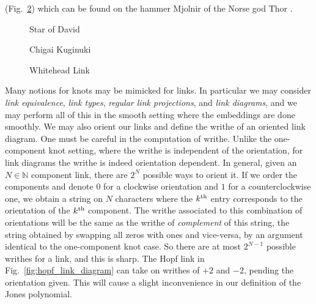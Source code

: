     (Fig.~\ref{fig:whitehead_link}) which can be found on the
    hammer Mjolnir of the Norse god Thor
    \cite[p.~309]{MonteliusMjolnirHopfLink}.
    \begin{figure}
        \centering
        \begin{minipage}[b]{0.49\textwidth}
            \centering
            \caption{Star of David}
            \label{fig:hopf_link_star_of_david}
        \end{minipage}
        \hfill
        \begin{minipage}[b]{0.49\textwidth}
            \centering
            \vspace{2em}
            \caption{Chigai Kuginuki}
            \label{fig:hopf_link_chigai_kuginuki}
        \end{minipage}
    \end{figure}
    \begin{figure}
        \centering
        \caption{Whitehead Link}
        \label{fig:whitehead_link}
    \end{figure}
    \par\hfill\par
    Many notions for knots may be mimicked for links. In particular we may
    consider \textit{link equivalence}, \textit{link types},
    \textit{regular link projections}, and \textit{link diagrams}, and we
    may perform all of this in the smooth setting where the embeddings are
    done smoothly. We may also orient our links and define the
    writhe of an oriented link
    diagram. One must be careful in the computation of writhe. Unlike the
    one-component knot setting, where the writhe is independent of the
    orientation, for link diagrams the writhe is indeed orientation dependent.
    In general, given an $N\in\mathbb{N}$ component link, there are
    $2^{N}$ possible ways to orient it. If we order the components and denote
    $0$ for a clockwise orientation and $1$ for a counterclockwise one, we
    obtain a string on $N$ characters where the $k^{\small\textrm{th}}$ entry
    corresponds to the orientation of the $k^{\small\textrm{th}}$ component.
    The writhe associated to this combination of orientations will be the same
    as the writhe of \textit{complement} of this string, the string
    obtained by swapping all zeros with ones and vice-versa,
    by an argument identical to the
    one-component knot case. So there are at most $2^{N-1}$ possible writhes
    for a link, and this is sharp. The Hopf link in
    Fig.~\ref{fig:hopf_link_diagram} can take on writhes of $+2$ and $-2$,
    pending the orientation given. This will cause a slight inconvenience in
    our definition of the Jones polynomial.
